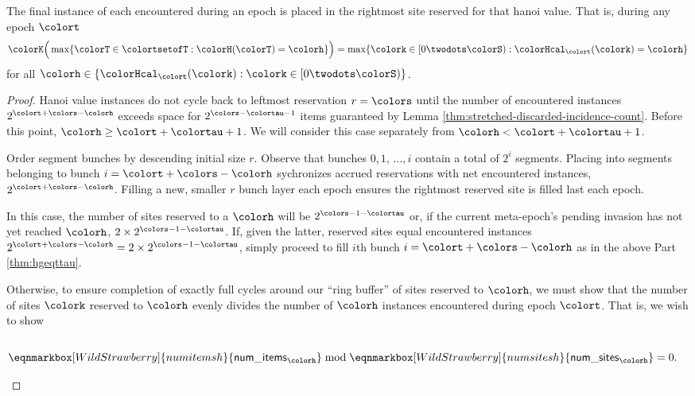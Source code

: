 \begin{lemma}
\label{thm:tilted-last-touched}
The final instance of each \hv{} encountered during an epoch is placed in the rightmost site reserved for that hanoi value.
That is, during any epoch $\colort$
\begin{align*}
\colorK\Big(
  \max\{\colorT \in \colortsetofT : \colorH(\colorT) = \colorh\}
\Big)
=
\max\{\colork \in [0\twodots\colorS) : \colorHcal_{\colort}(\colork) = \colorh \}
\end{align*}
for all $\colorh \in \{\colorHcal_{\colort}(\colork) : \colork \in [0\twodots\colorS)\}$.
\end{lemma}

\begin{proof}
Hanoi value instances do not cycle back to leftmost reservation $r=\colors$ until the number of encountered \hv{} instances $2^{\colort + \colors - \colorh}$ exceeds space for $2^{\colors - \colortau - 1}$ items guaranteed by Lemma \ref{thm:stretched-discarded-incidence-count}.
Before this point, $\colorh \geq \colort + \colortau + 1$.
We will consider this case separately from $\colorh < \colort + \colortau + 1$.

\begin{proofpart}
\label{thm:hgeqttau}
Order segment bunches by descending initial size $r$.
Observe that bunches $0,1,\,\ldots,i$ contain a total of $2^i$ segments.
Placing into segments belonging to bunch $i = \colort + \colors - \colorh$ sychronizes accrued reservations with net encountered \hv{} instances, $2^{\colort + \colors - \colorh}$.
Filling a new, smaller $r$ bunch layer each epoch ensures the rightmost reserved site is filled last each epoch.
\end{proofpart}

\begin{proofpart}
In this case, the number of sites reserved to a \hv{} $\colorh$ will be $2^{\colors - 1 - \colortau}$ or, if the current meta-epoch's pending invasion has not yet reached \hv{} $\colorh$, $2 \times 2^{\colors - 1 - \colortau}$.
If, given the latter, reserved sites equal encountered \hv{} instances $2^{\colort + \colors - \colorh} = 2 \times 2^{\colors - 1 - \colortau}$, simply proceed to fill $i$th bunch $i=\colort + \colors - \colorh$ as in the above Part \ref{thm:hgeqttau}.

Otherwise, to ensure completion of exactly full cycles around our ``ring buffer'' of sites reserved to \hv{} $\colorh$, we must show that the number of sites $\colork$ reserved to \hv{} $\colorh$ evenly divides the number of \hv{} $\colorh$ instances encountered during epoch $\colort$.
That is, we wish to show
\begin{align*}
\\
\eqnmarkbox[WildStrawberry]{numitemsh}{
  \mathsf{num\_items}_{\colorh}
}
\bmod
\eqnmarkbox[WildStrawberry]{numsitesh}{
  \mathsf{num\_sites}_{\colorh}
}
&= 0.
\end{align*}


\end{proofpart}
\end{proof}
